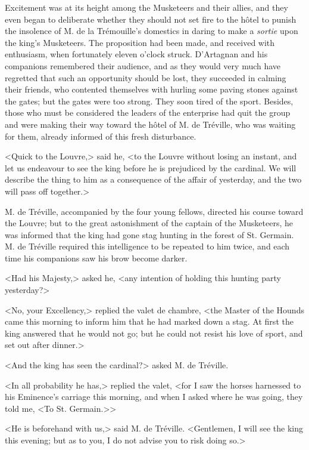 Excitement was at its height among the Musketeers and their allies, and they even began to deliberate whether they should not set fire to the hôtel to punish the insolence of M. de la Trémouille's domestics in daring to make a \textit{sortie} upon the king's Musketeers. The proposition had been made, and received with enthusiasm, when fortunately eleven o'clock struck. D'Artagnan and his companions remembered their audience, and as they would very much have regretted that such an opportunity should be lost, they succeeded in calming their friends, who contented themselves with hurling some paving stones against the gates; but the gates were too strong. They soon tired of the sport. Besides, those who must be considered the leaders of the enterprise had quit the group and were making their way toward the hôtel of M. de Tréville, who was waiting for them, already informed of this fresh disturbance. 

<Quick to the Louvre,> said he, <to the Louvre without losing an instant, and let us endeavour to see the king before he is prejudiced by the cardinal. We will describe the thing to him as a consequence of the affair of yesterday, and the two will pass off together.> 

M. de Tréville, accompanied by the four young fellows, directed his course toward the Louvre; but to the great astonishment of the captain of the Musketeers, he was informed that the king had gone stag hunting in the forest of St. Germain. M. de Tréville required this intelligence to be repeated to him twice, and each time his companions saw his brow become darker. 

<Had his Majesty,> asked he, <any intention of holding this hunting party yesterday?> 

<No, your Excellency,> replied the valet de chambre, <the Master of the Hounds came this morning to inform him that he had marked down a stag. At first the king answered that he would not go; but he could not resist his love of sport, and set out after dinner.> 

<And the king has seen the cardinal?> asked M. de Tréville. 

<In all probability he has,> replied the valet, <for I saw the horses harnessed to his Eminence's carriage this morning, and when I asked where he was going, they told me, <To St. Germain.>> 

<He is beforehand with us,> said M. de Tréville. <Gentlemen, I will see the king this evening; but as to you, I do not advise you to risk doing so.> 

